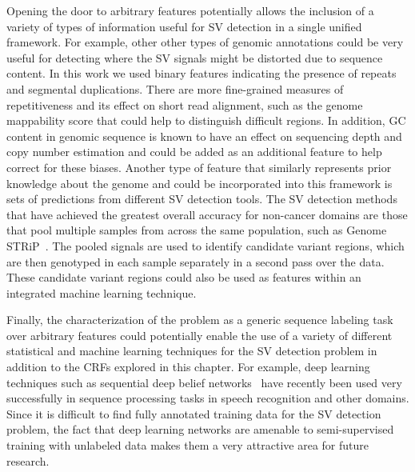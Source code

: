 Opening the door to arbitrary features potentially allows the inclusion of a variety of types of information useful for SV detection in a single unified framework. For example, other other types of genomic annotations could be very useful for detecting where the SV signals might be distorted due to sequence content. In this work we used binary features indicating the presence of repeats and segmental duplications. There are more fine-grained measures of repetitiveness and its effect on short read alignment, such as the genome mappability score \cite{Lee:2012bk} that could help to distinguish difficult regions. In addition, GC content in genomic sequence is known to have an effect on sequencing depth and copy number estimation \cite{Benjamini:2012er} and could be added as an additional feature to help correct for these biases. Another type of feature that similarly represents prior knowledge about the genome and could be incorporated into this framework is sets of predictions from different SV detection tools. The SV detection methods that have achieved the greatest overall accuracy for non-cancer domains are those that pool multiple samples from across the same population, such as Genome STRiP~\cite{Handsaker:2011ki}. The pooled signals are used to identify candidate variant regions, which are then genotyped in each sample separately in a second pass over the data. These candidate variant regions could also be used as features within an integrated machine learning technique.

Finally, the characterization of the problem as a generic sequence labeling task over arbitrary features could potentially enable the use of a variety of different statistical and machine learning techniques for the SV detection problem in addition to the CRFs explored in this chapter. For example, deep learning techniques such as sequential deep belief networks~\cite{andrew2012:sdbn} have recently been used very successfully in sequence processing tasks in speech recognition and other domains. Since it is difficult to find fully annotated training data for the SV detection problem, the fact that deep learning networks are amenable to semi-supervised training with unlabeled data \cite{weston2012} makes them a very attractive area for future research.